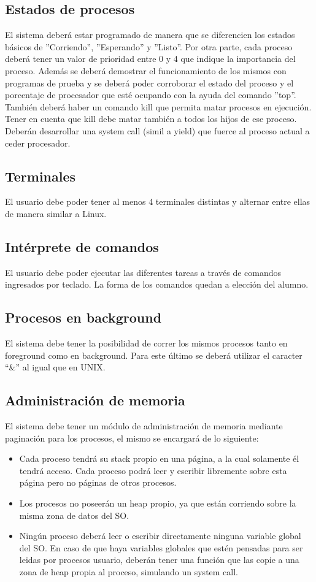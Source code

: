 \documentclass[a4paper,10pt]{article}
\begin{document}
\subsection{Estados de procesos}
El sistema deberá estar programado de manera que se diferencien los estados
básicos de ”Corriendo”, ”Esperando” y ”Listo”. Por otra parte, cada proceso
deberá tener un valor de prioridad entre 0 y 4 que indique la importancia del
proceso. Además se deberá demostrar el funcionamiento de los mismos con
programas de prueba y se deberá poder corroborar el estado del proceso y el
porcentaje de procesador que esté ocupando con la ayuda del comando ”top”.
También deberá haber un comando kill que permita matar procesos en ejecución.
Tener en cuenta que kill debe matar también a todos los hijos de ese proceso.
Deberán desarrollar una system call (simil a yield) que fuerce al proceso actual
a ceder procesador.

\subsection{Terminales}
El usuario debe poder tener al menos 4 terminales distintas y alternar entre
ellas de manera similar a Linux.

\subsection{Intérprete de comandos}
El usuario debe poder ejecutar las diferentes tareas a través de comandos ingresados 
por teclado. La forma de los comandos quedan a elección del alumno.

\subsection{Procesos en background}
El sistema debe tener la posibilidad de correr los mismos procesos tanto en
foreground como en background. Para este último se deberá utilizar el caracter
``\&'' al igual que en UNIX.

\subsection{Administración de memoria}
El sistema debe tener un módulo de administración de memoria mediante paginación 
para los procesos, el mismo se encargará de lo siguiente:

\begin{itemize}
 \item Cada proceso tendrá su stack propio en una página, a la cual solamente él
	tendrá acceso. Cada proceso podrá leer y escribir libremente sobre esta
	página pero no páginas de otros procesos.      
 \item Los procesos no poseerán un heap propio, ya que están corriendo sobre la
	misma zona de datos del SO.
 \item Ningún proceso deberá leer o escribir directamente ninguna variable global
	del SO. En caso de que haya variables globales que estén pensadas para
	ser leidas por procesos usuario, deberán tener una función que las copie a
	una zona de heap propia al proceso, simulando un system call.
\end{itemize}
\end{document}
